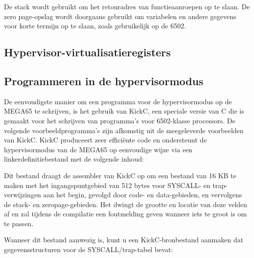 De stack wordt gebruikt om het retouradres van functieaanroepen op te slaan. De zero page-opslag wordt doorgaans gebruikt om variabelen en andere gegevens voor korte termijn op te slaan, zoals gebruikelijk op de 6502.

\subsection{Hypervisor-virtualisatieregisters}



\subsection{Programmeren in de hypervisormodus}

De eenvoudigste manier om een programma voor de hypervisormodus op de MEGA65 te schrijven, is het gebruik van KickC, een speciale versie van C die is gemaakt voor het schrijven van programma's voor 6502-klasse processors. De volgende voorbeeldprogramma's zijn afkomstig uit de meegeleverde voorbeelden van KickC. KickC produceert zeer efficiënte code en ondersteunt de hypervisormodus van de MEGA65 op eenvoudige wijze via een linkerdefinitiebestand met de volgende inhoud:


Dit bestand draagt de assembler van KickC op om een bestand van 16 KB te maken met het ingangspuntgebied van 512 bytes voor SYSCALL- en trap-verwijzingen aan het begin, gevolgd door code- en data-gebieden, en vervolgens de stack- en zeropage-gebieden. Het dwingt de grootte en locatie van deze velden af en zal tijdens de compilatie een foutmelding geven wanneer iets te groot is om te passen.

Wanneer dit bestand aanwezig is, kunt u een KickC-bronbestand aanmaken dat gegevensstructuren voor de SYSCALL/trap-tabel bevat:

